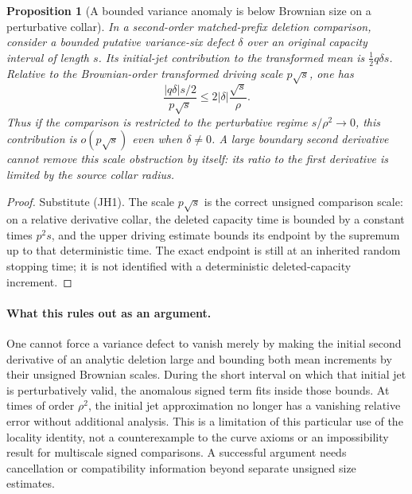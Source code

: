 \documentclass[11pt]{article}
\newtheorem{proposition}[theorem]{Proposition}
\theoremstyle{definition}\newtheorem{definition}[theorem]{Definition}
\theoremstyle{remark}\newtheorem{remark}[theorem]{Remark}
\begin{document}
\begin{proposition}[A bounded variance anomaly is below Brownian size on a perturbative collar]
\label{prop:unsigned-locality-jet-horizon}
In a second-order matched-prefix deletion comparison, consider a bounded
putative variance-six defect $\delta$ over an original capacity interval
of length $s$. Its initial-jet contribution to the transformed mean is
$\tfrac12q\delta s$. Relative to the Brownian-order transformed driving
scale $p\sqrt s$, one has
\[
 \frac{|q\delta|s/2}{p\sqrt s}
       \le2|\delta|\frac{\sqrt s}{\rho}.
 \tag{JH2}
\]
Thus if the comparison is restricted to the perturbative regime
$s/\rho^2\to0$, this contribution is $o(p\sqrt s)$ even when
$\delta\ne0$. A large boundary second derivative cannot remove this
scale obstruction by itself: its ratio to the first derivative is
limited by the source collar radius.
\end{proposition}
\begin{proof}
Substitute (JH1). The scale $p\sqrt s$ is the correct unsigned comparison
scale: on a relative derivative collar, the deleted capacity time is
bounded by a constant times $p^2s$, and the upper driving estimate bounds
its endpoint by the supremum up to that deterministic time. The exact
endpoint is still at an inherited random stopping time; it is not
identified with a deterministic deleted-capacity increment.
\end{proof}

\paragraph{What this rules out as an argument.}
One cannot force a variance defect to vanish merely by making the initial
second derivative of an analytic deletion large and bounding both mean
increments by their unsigned Brownian scales. During the short interval
on which that initial jet is perturbatively valid, the anomalous signed
term fits inside those bounds. At times of order $\rho^2$, the initial
jet approximation no longer has a vanishing relative error without
additional analysis. This is a limitation of this particular use of the
locality identity, not a counterexample to the curve axioms or an
impossibility result for multiscale signed comparisons. A successful
argument needs cancellation or compatibility information beyond separate
unsigned size estimates.


\end{document}
